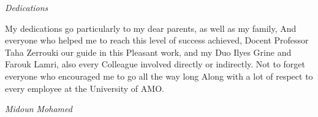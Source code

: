 \begin{center}
\Huge{\emph{Dedications}}
\end{center}

\vspace{1cm}
My dedications go particularly to my dear parents, as well as my family, 
And everyone who helped me to reach this level of success achieved, 
Docent Professor Taha Zerrouki our guide in this Pleasant work, and my Duo 
Ilyes Grine and Farouk Lamri, also every Colleague involved directly or indirectly. 
Not to forget everyone who encouraged me to go all the way long 
Along with a lot of respect to every employee at the University of AMO.


\vspace{3cm}
\begin{flushright}
	\textit{Midoun Mohamed}
\end{flushright}